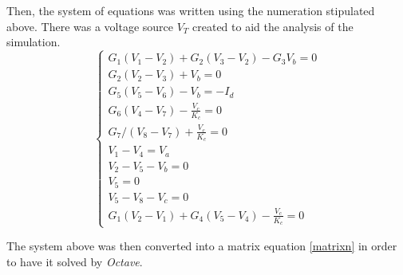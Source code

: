 \par Then, the system of equations was written using the numeration stipulated above. There was a voltage source $V_T$ created to aid the analysis of the simulation.
$$
\begin{cases} 
	G_1(V_1-V_2)+G_2(V_3-V_2)-G_3V_b = 0 \\
	G_2(V_2-V_3)+V_b = 0 \\ 
	G_5(V_5-V_6)-V_b = -I_d \\
	G_6(V_4-V_7)-\frac{V_c}{K_c} = 0 \\
	G_7/(V_8-V_7)+\frac{V_c}{K_c} = 0 \\
	V_1-V_4 = V_a \\
	V_2-V_5-V_b = 0 \\
	V_5 = 0 \\
	V_5-V_8-V_c = 0 \\
	G_1(V_2-V_1)+G_4(V_5-V_4)-\frac{V_c}{K_c} = 0 
\label{system nodes}
\end{cases}
$$
\par The system above was then converted into a matrix equation \ref{matrixn} in order to have it solved by \textit{Octave}.
